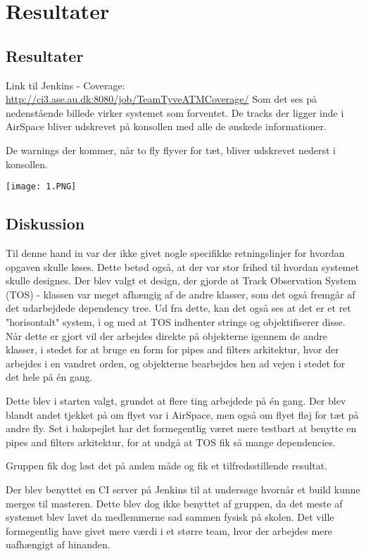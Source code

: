 \graphicspath{{Billeder/}}
\chapter{Resultater}

\section{Resultater}
Link til Jenkins - Coverage: \url{http://ci3.ase.au.dk:8080/job/TeamTyveATMCoverage/} \newline
Som det ses på nedenstående billede virker systemet som forventet. De tracks der ligger inde i AirSpace bliver udskrevet på konsollen med alle de ønskede informationer.

De warnings der kommer, når to fly flyver for tæt, bliver udskrevet nederst i konsollen.

\texttt{[image: 1.PNG]}

\section{Diskussion}
Til denne hand in var der ikke givet nogle specifikke retningslinjer for hvordan opgaven skulle løses. Dette betød også, at der var stor frihed til hvordan systemet skulle designes. \tabularnewline
Der blev valgt et design, der gjorde at Track Observation System (TOS) - klassen var meget afhængig af de andre klasser, som det også fremgår af det udarbejdede dependency tree. 
Ud fra dette, kan det også ses at det er et ret "horisontalt" system, i og med at TOS indhenter strings og objektifiserer disse. 
Når dette er gjort vil der arbejdes direkte på objekterne igennem de andre klasser, i stedet for at bruge en form for pipes and filters arkitektur, hvor der arbejdes i en vandret orden, og objekterne bearbejdes hen ad vejen i stedet for det hele på én gang. 

Dette blev i starten valgt, grundet at flere ting arbejdede på én gang. Der blev blandt andet tjekket på om flyet var i AirSpace, men også om flyet fløj for tæt på andre fly. \tabularnewline
Set i bakspejlet har det formegentlig været mere testbart at benytte en pipes and filters arkitektur, for at undgå at TOS fik så mange dependencies.

Gruppen fik dog løst det på anden måde og fik et tilfredsstillende resultat.


Der blev benyttet en CI server på Jenkins til at undersøge hvornår et build kunne merges til masteren. \tabularnewline
Dette blev dog ikke benyttet af gruppen, da det meste af systemet blev lavet da medlemmerne sad sammen fysisk på skolen.\tabularnewline
Det ville formegentlig have givet mere værdi i et større team, hvor der arbejdes mere uafhængigt af hinanden. \newline
\pagebreak

